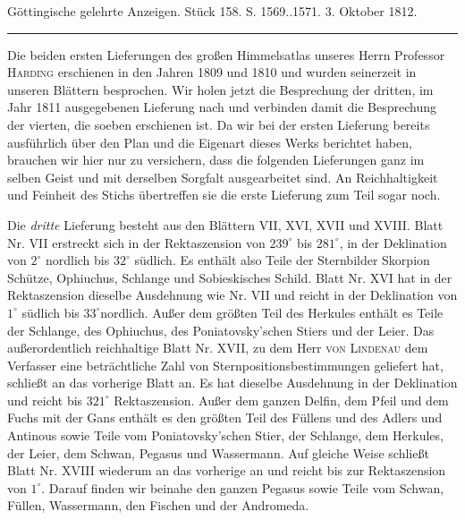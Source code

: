 \clearpage
{}
\hypertarget{native-546-lower}{}\label{native-546-lower}
\begin{center}\small Göttingische gelehrte Anzeigen. Stück 158. S. 1569..1571. 3. Oktober 1812.\\[3pt]\rule{.72\linewidth}{.3pt}\end{center}

Die beiden ersten Lieferungen des großen Himmelsatlas unseres Herrn Professor \textsc{Harding} erschienen in den Jahren 1809 und 1810 und wurden seinerzeit in unseren Blättern besprochen. Wir holen jetzt die Besprechung der dritten, im Jahr 1811 ausgegebenen Lieferung nach und verbinden damit die Besprechung der vierten, die soeben erschienen ist. Da wir bei der ersten Lieferung bereits ausführlich über den Plan und die Eigenart dieses Werks berichtet haben, brauchen wir hier nur zu versichern, dass die folgenden Lieferungen ganz im selben Geist und mit derselben Sorgfalt ausgearbeitet sind. An Reichhaltigkeit und Feinheit des Stichs übertreffen sie die erste Lieferung zum Teil sogar noch.

Die \emph{dritte} Lieferung besteht aus den Blättern VII, XVI, XVII und XVIII. Blatt Nr. VII erstreckt sich in der Rektaszension von $239^\circ$ bis $281^\circ$, in der Deklination von $2^\circ$ nordlich bis $32^\circ$ südlich. Es enthält also Teile der Sternbilder Skorpion Schütze, Ophiuchus, Schlange und Sobieskisches Schild. Blatt Nr. XVI hat in der Rektaszension dieselbe Ausdehnung wie Nr. VII und reicht in der Deklination von $1^\circ$ südlich bis $33^\circ$nordlich. Außer dem größten Teil des Herkules enthält es Teile der Schlange, des Ophiuchus, des Poniatovsky'schen Stiers und der Leier. Das außerordentlich reichhaltige Blatt Nr. XVII, zu dem Herr \textsc{von Lindenau} dem Verfasser eine beträchtliche Zahl von Sternpositionsbestimmungen geliefert hat, schließt an das vorherige Blatt an. Es hat dieselbe Ausdehnung in der Deklination und reicht bis $321^\circ$ Rektaszension. Außer dem ganzen Delfin, dem Pfeil und dem Fuchs mit der Gans enthält es den größten Teil des Füllens und des Adlers und Antinous sowie Teile vom Poniatovsky'schen Stier, der Schlange, dem Herkules, der Leier, dem Schwan, Pegasus und Wassermann. Auf gleiche Weise schließt Blatt Nr. XVIII wiederum an das vorherige an und reicht bis zur Rektaszension von $1^\circ$. Darauf finden wir beinahe den ganzen Pegasus sowie Teile vom Schwan, Füllen, Wassermann, den Fischen und der Andromeda.

